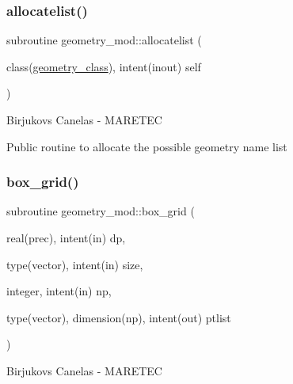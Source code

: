 \subsubsection{\texorpdfstring{allocatelist()}{allocatelist()}}
{\footnotesize\ttfamily subroutine geometry\+\_\+mod\+::allocatelist (\begin{DoxyParamCaption}\item[{class(\hyperlink{structgeometry__mod_1_1geometry__class}{geometry\+\_\+class}), intent(inout)}]{self }\end{DoxyParamCaption})\hspace{0.3cm}{\ttfamily [private]}}



Birjukovs Canelas -\/ M\+A\+R\+E\+T\+EC 

Public routine to allocate the possible geometry name list \mbox{\label{namespacegeometry__mod_ae87e4ecff2d21a839da2b82919b5fd0b}} 
\subsubsection{\texorpdfstring{box\+\_\+grid()}{box\_grid()}}
{\footnotesize\ttfamily subroutine geometry\+\_\+mod\+::box\+\_\+grid (\begin{DoxyParamCaption}\item[{real(prec), intent(in)}]{dp,  }\item[{type(vector), intent(in)}]{size,  }\item[{integer, intent(in)}]{np,  }\item[{type(vector), dimension(np), intent(out)}]{ptlist }\end{DoxyParamCaption})\hspace{0.3cm}{\ttfamily [private]}}



Birjukovs Canelas -\/ M\+A\+R\+E\+T\+EC 


